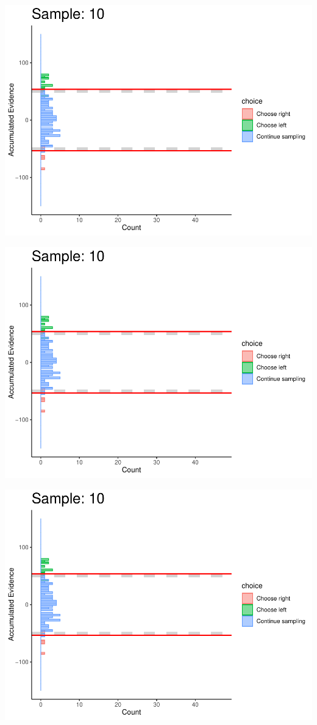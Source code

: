 \documentclass[
]{book}
\begin{document}
\begin{center}\includegraphics[width=0.8\linewidth]{LateNightBayes_files/figure-latex/fixed_dcb-91} \end{center}

\begin{center}\includegraphics[width=0.8\linewidth]{LateNightBayes_files/figure-latex/fixed_dcb-92} \end{center}

\begin{center}\includegraphics[width=0.8\linewidth]{LateNightBayes_files/figure-latex/fixed_dcb-93} \end{center}
\end{document}
